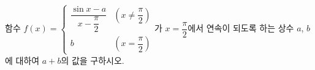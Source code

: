 함수 $f(x)=\begin{cases} \dfrac{\sin x-a}{x-\dfrac{\pi}{2}} & \left(x\ne\dfrac{\pi}{2}\right) \\[3mm] b & \left(x=\dfrac{\pi}{2}\right) \end{cases}$가 $x=\dfrac{\pi}{2}$에서 연속이 되도록 하는 상수 $a$, $b$에 대하여 $a+b$의 값을 구하시오.
